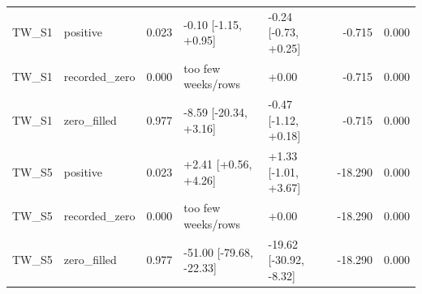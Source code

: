 \begin{tabular}{llrllrr}
TW\_S1 & positive & 0.023 & -0.10 [-1.15, +0.95] & -0.24 [-0.73, +0.25] & -0.715 & 0.000 \\
TW\_S1 & recorded\_zero & 0.000 & too few weeks/rows & +0.00 & -0.715 & 0.000 \\
TW\_S1 & zero\_filled & 0.977 & -8.59 [-20.34, +3.16] & -0.47 [-1.12, +0.18] & -0.715 & 0.000 \\
TW\_S5 & positive & 0.023 & +2.41 [+0.56, +4.26] & +1.33 [-1.01, +3.67] & -18.290 & 0.000 \\
TW\_S5 & recorded\_zero & 0.000 & too few weeks/rows & +0.00 & -18.290 & 0.000 \\
TW\_S5 & zero\_filled & 0.977 & -51.00 [-79.68, -22.33] & -19.62 [-30.92, -8.32] & -18.290 & 0.000 \\
\bottomrule
\end{tabular}
